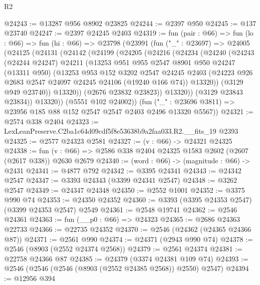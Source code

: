 \begin{lexlean}{R2}
\begin{coremodule}
@24243 := @13287 @956 @8902 @23825
@24244 := @2397 @950
@24245 := @137 @23740
@24247 := @2397 @24245 @2403
@24319 := fun (pair : @66) =>
  fun (lo : @66) =>
  fun (hi : @66) =>
  @23798
    (@23991
      (fun ("_" : @23697) =>
      @24005
        (@24125
          (@24131
            (@24142
              (@24199
                (@24205
                  (@24216
                    (@24234
                      (@24240
                        (@24243
                          (@24244 @24247)
                          @24211
                          (@13253
                            @951
                            @955
                            @2547
                            @8901
                            @950
                            @24247
                            (@13311 @950)
                            (@13253
                              @953
                              @152
                              @3202
                              @2547
                              @24245
                              @2403
                              (@24223 @926 @2683 @2547 @24097 @24245 @24106 (@19240 @166 @74))
                              @13320))
                          (@3129 @949 @23740))
                        @13320))
                    (@2676 @23832 @23823))
                  @13320))
              (@3129 @23843 @23834))
            @13320))
        (@5551 @102 @24002))
      (fun ("_" : @23696 @3811) => @23956 @185 @88 @152 @2547 @2547 @2403 @2496 @13320 @5567))
@24321 := @2574 @338 @2404
@24323 := LexLeanPreserve.C2ba1c64d09cdf5f8e53638b9a2faa033.R2.__fits_19 @2393
@24325 := @2577 @24323 @2581
@24327 := (v : @66) -> @24321 @24325
@24338 := fun (v : @66) => @2586 @338 @2404 @24325 @1583 @2602 (@2607 (@2617 @338)) @2630 @2679
@24340 := (word : @66) -> (magnitude : @66) -> @2431
@24341 := @4877 @792
@24342 := @3395 @24341
@24343 := @24342 @2547
@24347 := @3393 @24343 (@3399 @24341 @2547)
@24348 := @3262 @2547
@24349 := @24347 @24348
@24350 := @2552 @1001
@24352 := @3375 @990 @74
@24353 := @24350 @24352
@24360 := @3393 (@3395 @24353 @2547) (@3399 @24353 @2547) @2549
@24361 := @2548 @19741
@24362 := @2546 @24361
@24363 := fun (__p0 : @66) => @24323
@24365 := @2686 @24363 @22733
@24366 := @22735 @24352
@24370 := @2546 (@24362 (@24365 @24366 @87))
@24371 := @2561 @990
@24374 := @24371 (@2943 @990 @74)
@24378 := @2546 (@8903 (@2552 @24374 @2568))
@24379 := @2561 @24374
@24381 := @22758 @24366 @87
@24385 := @24379 (@3374 @24381 @109 @74)
@24393 := @2546 (@2546 (@2546 (@8903 (@2552 @24385 @2568)) @2550) @2547)
@24394 := @12956 @394

\end{coremodule}
\end{lexlean}
